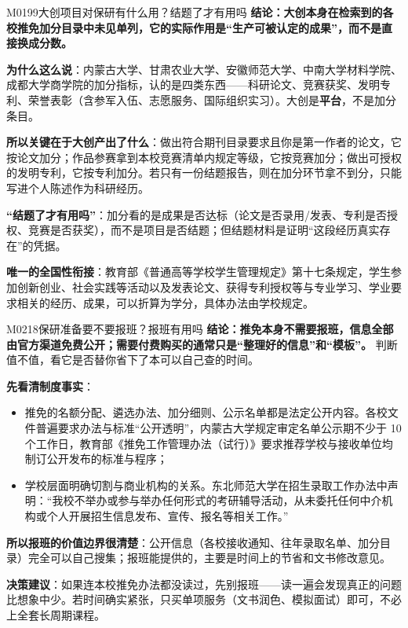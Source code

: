 \begin{qa}{M0199}{大创项目对保研有什么用？结题了才有用吗}
\textbf{结论：大创本身在检索到的各校推免加分目录中未见单列，它的实际作用是“生产可被认定的成果”，而不是直接换成分数。}

\textbf{为什么这么说}：内蒙古大学、甘肃农业大学、安徽师范大学、中南大学材料学院、成都大学商学院的加分指标，认的是四类东西——科研论文、竞赛获奖、发明专利、荣誉表彰（含参军入伍、志愿服务、国际组织实习）。大创是\textbf{平台}，不是加分条目。

\textbf{所以关键在于大创产出了什么}：做出符合期刊目录要求且你是第一作者的论文，它按论文加分；作品参赛拿到本校竞赛清单内规定等级，它按竞赛加分；做出可授权的发明专利，它按专利加分。若只有一份结题报告，则在加分环节拿不到分，只能写进个人陈述作为科研经历。

\textbf{“结题了才有用吗”}：加分看的是成果是否达标（论文是否录用/发表、专利是否授权、竞赛是否获奖），而不是项目是否结题；但结题材料是证明“这段经历真实存在”的凭据。

\textbf{唯一的全国性衔接}：教育部《普通高等学校学生管理规定》第十七条规定，学生参加创新创业、社会实践等活动以及发表论文、获得专利授权等与专业学习、学业要求相关的经历、成果，可以折算为学分，具体办法由学校规定。
\end{qa}

\begin{qa}{M0218}{保研准备要不要报班？报班有用吗}
\textbf{结论：推免本身不需要报班，信息全部由官方渠道免费公开；需要付费购买的通常只是“整理好的信息”和“模板”。} 判断值不值，看它是否替你省下了本可以自己查的时间。

\textbf{先看清制度事实}：
\begin{itemize}
  \item 推免的名额分配、遴选办法、加分细则、公示名单都是法定公开内容。各校文件普遍要求办法与标准“公开透明”，内蒙古大学规定审定名单公示期不少于 10 个工作日，教育部《推免工作管理办法（试行）》要求推荐学校与接收单位均制订公开发布的标准与程序；
  \item 学校层面明确切割与商业机构的关系。东北师范大学在招生录取工作办法中声明：“我校不举办或参与举办任何形式的考研辅导活动，从未委托任何中介机构或个人开展招生信息发布、宣传、报名等相关工作。”
\end{itemize}

\textbf{所以报班的价值边界很清楚}：公开信息（各校接收通知、往年录取名单、加分目录）完全可以自己搜集；报班能提供的，主要是时间上的节省和文书修改意见。

\textbf{决策建议}：如果连本校推免办法都没读过，先别报班——读一遍会发现真正的问题比想象中少。若时间确实紧张，只买单项服务（文书润色、模拟面试）即可，不必上全套长周期课程。
\end{qa}

